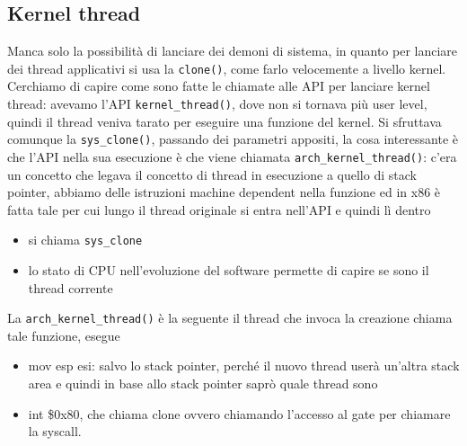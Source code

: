 \documentclass[12pt, oneside]{extbook}
\begin{document}
\subsection{Kernel thread}
Manca solo la possibilità di lanciare dei demoni di sistema, in quanto per lanciare dei thread applicativi si usa la \texttt{clone()}, come farlo velocemente a livello kernel.\\Cerchiamo di capire come sono fatte le chiamate alle API per lanciare kernel thread: avevamo l'API \texttt{kernel\_thread()}, dove non si tornava più user level, quindi il thread veniva tarato per eseguire una funzione del kernel. Si sfruttava comunque la \texttt{sys\_clone()}, passando dei parametri appositi, la cosa interessante è che l'API nella sua esecuzione è che viene chiamata \texttt{arch\_kernel\_thread()}: c'era un concetto che legava il concetto di thread in esecuzione a quello di stack pointer, abbiamo delle istruzioni machine dependent nella funzione ed in x86 è fatta tale per cui lungo il thread originale si entra nell'API e quindi lì dentro
\begin{itemize}
\item si chiama \texttt{sys\_clone}
\item lo stato di CPU nell'evoluzione del software permette di capire se sono il thread corrente
\end{itemize}
La \texttt{arch\_kernel\_thread()} è la seguente
il thread che invoca la creazione chiama tale funzione, esegue 
\begin{itemize}
\item mov esp esi: salvo lo stack pointer, perché il nuovo thread userà un'altra stack area e quindi in base allo stack pointer saprò quale thread sono
\item int \$0x80, che chiama clone ovvero chiamando l'accesso al gate per chiamare la syscall.
\end{itemize}
\end{document}
